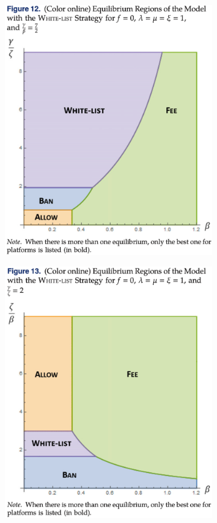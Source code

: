 \documentclass{beamer}
\begin{document}
\begin{frame}
\begin{figure}
\begin{subfigure}[b]{0.3\textwidth}
            \includegraphics[width=\textwidth]{f12}
        \end{subfigure}
        \hfill
        \begin{subfigure}[b]{0.3\textwidth}
            \centering
            \includegraphics[width=\textwidth]{f13}

\end{subfigure}
\end{figure}
\end{frame}
\end{document}
